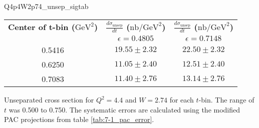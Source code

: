 \begin{Mtable}{Q4p4W2p74_unsep_sigtab}
  \centering
  \begin{tabular}{|c|c|c|}
    \hline
    \textbf{Center of t-bin ($\mathrm{GeV}^2$)} & \textbf{$\frac{d\sigma_{\mathrm{unsep}}}{dt}$ ($\mathrm{nb/GeV}^2$)} & \textbf{$\frac{d\sigma_{\mathrm{unsep}}}{dt}$ ($\mathrm{nb/GeV}^2$)} \\
    & $\epsilon=0.4805$ & $\epsilon=0.7148$ \\
    \hline
    0.5416 & $19.55\pm2.32$ & $22.50\pm2.32$\\
    0.6250 & $11.05\pm2.40$ & $12.51\pm2.40$\\
    0.7083 & $11.40\pm2.76$ & $13.14\pm2.76$\\
    \hline
  \end{tabular}
  \caption{Unseparated cross section for $Q^2=4.4$ and $W=2.74$ for each $t$-bin. The range of $t$ was 0.500 to 0.750. The systematic errors are calculated using the modified PAC projections from table \ref{tab:7-1_pac_error}.}
  \label{tab:Q4p4W2p74_unsep_sigtab}
\end{Mtable}

